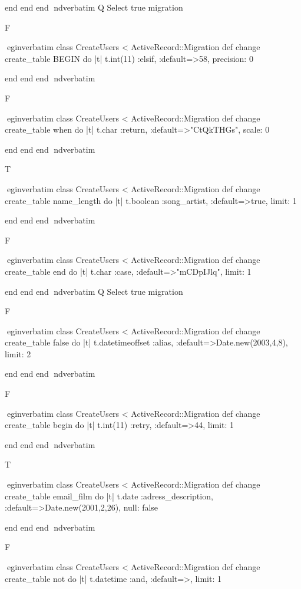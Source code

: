     end 
  end 
end
nd{verbatim}
Q
 Select true migration

F

egin{verbatim}
 class CreateUsers < ActiveRecord::Migration 
  def change 
    create_table BEGIN do |t| 
      t.int(11) :elsif, :default=>58, precision: 0
    
    end 
  end 
end
nd{verbatim}

F

egin{verbatim}
 class CreateUsers < ActiveRecord::Migration 
  def change 
    create_table when do |t| 
      t.char :return, :default=>"CtQkTHGs", scale: 0
    
    end 
  end 
end
nd{verbatim}

T

egin{verbatim}
 class CreateUsers < ActiveRecord::Migration 
  def change 
    create_table name_length do |t| 
      t.boolean :song_artist, :default=>true, limit: 1
    
    end 
  end 
end
nd{verbatim}

F

egin{verbatim}
 class CreateUsers < ActiveRecord::Migration 
  def change 
    create_table end do |t| 
      t.char :case, :default=>"mCDpIJlq", limit: 1
    
    end 
  end 
end
nd{verbatim}
Q
 Select true migration

F

egin{verbatim}
 class CreateUsers < ActiveRecord::Migration 
  def change 
    create_table false do |t| 
      t.datetimeoffset :alias, :default=>Date.new(2003,4,8), limit: 2
    
    end 
  end 
end
nd{verbatim}

F

egin{verbatim}
 class CreateUsers < ActiveRecord::Migration 
  def change 
    create_table begin do |t| 
      t.int(11) :retry, :default=>44, limit: 1
    
    end 
  end 
end
nd{verbatim}

T

egin{verbatim}
 class CreateUsers < ActiveRecord::Migration 
  def change 
    create_table email_film do |t| 
      t.date :adress_description, :default=>Date.new(2001,2,26), null: false
    
    end 
  end 
end
nd{verbatim}

F

egin{verbatim}
 class CreateUsers < ActiveRecord::Migration 
  def change 
    create_table not do |t| 
      t.datetime :and, :default=>, limit: 1
    
